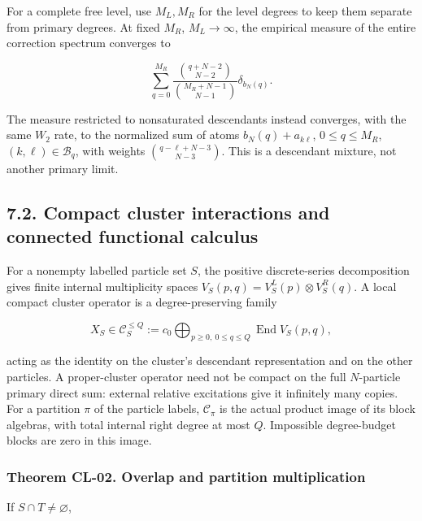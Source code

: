 \documentclass[a4paper,11pt]{article}
\numberwithin{equation}{section}
\begin{document}
For a complete free level, use \(M_L,M_R\) for the level degrees to keep them separate from primary degrees. At fixed \(M_R\), \(M_L\to\infty\), the empirical measure of the entire correction spectrum converges to

\[
\sum_{q=0}^{M_R}
\frac{\binom{q+N-2}{N-2}}{\binom{M_R+N-1}{N-1}}
\delta_{b_N(q)}.
\tag{CL.4}
\]

The measure restricted to nonsaturated descendants instead converges, with the same \(W_2\) rate, to the normalized sum of atoms \(b_N(q)+a_{k\ell}\), \(0\leq q\leq M_R\), \((k,\ell)\in\mathcal B_q\), with weights \(\binom{q-\ell+N-3}{N-3}\). This is a descendant mixture, not another primary limit.

\hypertarget{compact-cluster-interactions-and-connected-functional-calculus}{%
\subsection{7.2. Compact cluster interactions and connected functional calculus}\label{compact-cluster-interactions-and-connected-functional-calculus}}

For a nonempty labelled particle set \(S\), the positive discrete-series decomposition gives finite internal multiplicity spaces \(V_S(p,q)=V_S^L(p)\otimes V_S^R(q)\). A local compact cluster operator is a degree-preserving family

\[
X_S\in\mathcal C_S^{\leq Q}:=
 c_0\!\bigoplus_{p\geq0,\ 0\leq q\leq Q}\operatorname{End}V_S(p,q),
\tag{CL.5}
\]

acting as the identity on the cluster's descendant representation and on the other particles. A proper-cluster operator need not be compact on the full \(N\)-particle primary direct sum: external relative excitations give it infinitely many copies. For a partition \(\pi\) of the particle labels, \(\mathcal C_\pi\) is the actual product image of its block algebras, with total internal right degree at most \(Q\). Impossible degree-budget blocks are zero in this image.

\hypertarget{theorem-cl-02.-overlap-and-partition-multiplication}{%
\subsubsection{Theorem CL-02. Overlap and partition multiplication}\label{theorem-cl-02.-overlap-and-partition-multiplication}}

If \(S\cap T\ne\varnothing\),
\end{document}
